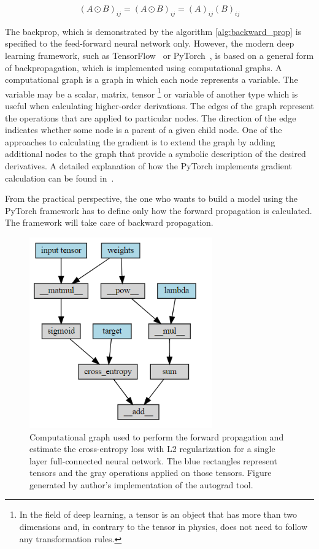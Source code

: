 \begin{equation}
    (A \odot B)_{ij} = (A \odot B)_{ij} = (A)_{ij} (B)_{ij}
\end{equation}

The backprop, which is demonstrated by the algorithm \ref{alg:backward_prop} is specified to the feed-forward neural network only. However, the modern deep learning framework, such as TensorFlow~\cite{tensorflow} or PyTorch~\cite{pytorch}, is based on a general form of backpropagation, which is implemented using computational graphs. 
A computational graph is a graph in which each node represents a variable. The variable may be a scalar, matrix,  tensor \footnote{In the field of deep learning, a tensor is an object that has more than two dimensions and, in contrary to the tensor in physics, does not need to follow any transformation rules.} or variable of another type which is useful when calculating higher-order derivations.    
The edges of the graph represent the operations that are applied to particular nodes. The direction of the edge indicates whether some node is a parent of a given child node. 
One of the approaches to calculating the gradient is to extend the graph by adding additional nodes to the graph that provide a symbolic description of the desired derivatives. A detailed explanation of how the PyTorch implements gradient calculation can be found in~\cite{autograd}. 

From the practical perspective, the one who wants to build a model using the PyTorch framework has to define only how the forward propagation is calculated. The framework will take care of backward propagation.

\begin{figure}[!ht]
\centering
\includegraphics[width=0.7\textwidth]{figures/Comput_graph_2.PNG}
\caption{Computational graph used to perform the forward propagation and estimate the cross-entropy loss with L2 regularization for a single layer full-connected neural network. The blue rectangles represent tensors and the gray operations applied on those tensors. Figure generated by author's implementation of the autograd tool.
}
\label{fig:Comput_graph}
\end{figure} 

